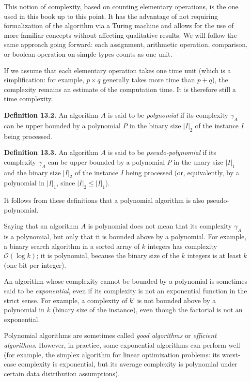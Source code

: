 \medskip
This notion of complexity, based on counting elementary operations, is the one used in this book up to this point. It has the advantage of not requiring formalization of the algorithm via a Turing machine and allows for the use of more familiar concepts without affecting qualitative results. We will follow the same approach going forward: each assignment, arithmetic operation, comparison, or boolean operation on simple types counts as one unit.

If we assume that each elementary operation takes one time unit (which is a simplification: for example, $p \times q$ generally takes more time than $p + q$), the complexity remains an estimate of the computation time. It is therefore still a time complexity.

\medskip
\noindent\textbf{Definition 13.2.} An algorithm $A$ is said to be \textit{polynomial} if its complexity $\gamma_A$ can be upper bounded by a polynomial $P$ in the binary size $|I|_2$ of the instance $I$ being processed.

\medskip
\noindent\textbf{Definition 13.3.} An algorithm $A$ is said to be \textit{pseudo-polynomial} if its complexity $\gamma_A$ can be upper bounded by a polynomial $P$ in the unary size $|I|_1$ and the binary size $|I|_2$ of the instance $I$ being processed (or, equivalently, by a polynomial in $|I|_1$, since $|I|_2 \leq |I|_1$).

\medskip
It follows from these definitions that a polynomial algorithm is also pseudo-polynomial.

Saying that an algorithm $A$ is polynomial does not mean that its complexity $\gamma_A$ is a polynomial, but only that it is bounded above by a polynomial. For example, a binary search algorithm in a sorted array of $k$ integers has complexity $\mathcal{O}(\log k)$; it is polynomial, because the binary size of the $k$ integers is at least $k$ (one bit per integer).

An algorithm whose complexity cannot be bounded by a polynomial is sometimes said to be \textit{exponential}, even if its complexity is not an exponential function in the strict sense. For example, a complexity of $k!$ is not bounded above by a polynomial in $k$ (binary size of the instance), even though the factorial is not an exponential.

Polynomial algorithms are sometimes called \textit{good algorithms} or \textit{efficient algorithms}. However, in practice, some exponential algorithms can perform well (for example, the simplex algorithm for linear optimization problems: its worst-case complexity is exponential, but its average complexity is polynomial under certain data distribution assumptions).

